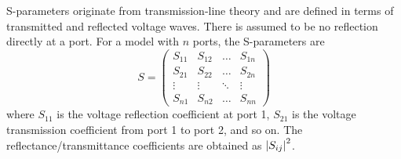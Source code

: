 S-parameters originate from transmission-line theory and are defined in terms of transmitted and reflected voltage waves. There is assumed to be no reflection directly at a port. For a model with $n$ ports, the S-parameters are \cite{comsol_waveopticsmodule}
\begin{equation}
    S = 
    \begin{pmatrix}
    S_{11} & S_{12} & \dots  & S_{1n} \\
    S_{21} & S_{22} & \dots  & S_{2n} \\
    \vdots & \vdots & \ddots & \vdots \\
    S_{n1} & S_{n2} & \dots  & S_{nn}
\end{pmatrix}
\end{equation}
where $S_{11}$ is the voltage reflection coefficient at port 1, $S_{21}$ is the voltage transmission coefficient from port 1 to port 2, and so on. The reflectance/transmittance coefficients are obtained as $\left| S_{ij} \right|^2$.


